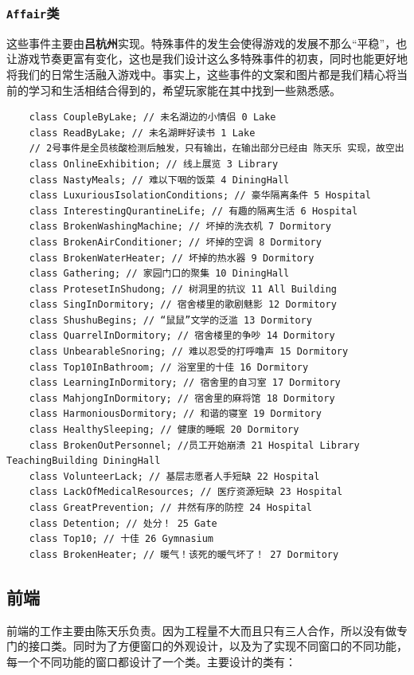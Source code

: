 \documentclass[hyperref,a4paper,UTF8]{ctexart}
\begin{document}
\subsubsection{\texttt{Affair}类}
这些事件主要由\textbf{吕杭州}实现。特殊事件的发生会使得游戏的发展不那么“平稳”，也让游戏节奏更富有变化，这也是我们设计这么多特殊事件的初衷，同时也能更好地将我们的日常生活融入游戏中。事实上，这些事件的文案和图片都是我们精心将当前的学习和生活相结合得到的，希望玩家能在其中找到一些熟悉感。
\begin{verbatim}
    class CoupleByLake; // 未名湖边的小情侣 0 Lake
    class ReadByLake; // 未名湖畔好读书 1 Lake
    // 2号事件是全员核酸检测后触发，只有输出，在输出部分已经由 陈天乐 实现，故空出
    class OnlineExhibition; // 线上展览 3 Library
    class NastyMeals; // 难以下咽的饭菜 4 DiningHall
    class LuxuriousIsolationConditions; // 豪华隔离条件 5 Hospital
    class InterestingQurantineLife; // 有趣的隔离生活 6 Hospital
    class BrokenWashingMachine; // 坏掉的洗衣机 7 Dormitory
    class BrokenAirConditioner; // 坏掉的空调 8 Dormitory
    class BrokenWaterHeater; // 坏掉的热水器 9 Dormitory
    class Gathering; // 家园门口的聚集 10 DiningHall
    class ProtesetInShudong; // 树洞里的抗议 11 All Building
    class SingInDormitory; // 宿舍楼里的歌剧魅影 12 Dormitory
    class ShushuBegins; // “鼠鼠”文学的泛滥 13 Dormitory
    class QuarrelInDormitory; // 宿舍楼里的争吵 14 Dormitory
    class UnbearableSnoring; // 难以忍受的打呼噜声 15 Dormitory
    class Top10InBathroom; // 浴室里的十佳 16 Dormitory
    class LearningInDormitory; // 宿舍里的自习室 17 Dormitory
    class MahjongInDormitory; // 宿舍里的麻将馆 18 Dormitory
    class HarmoniousDormitory; // 和谐的寝室 19 Dormitory
    class HealthySleeping; // 健康的睡眠 20 Dormitory
    class BrokenOutPersonnel; //员工开始崩溃 21 Hospital Library TeachingBuilding DiningHall
    class VolunteerLack; // 基层志愿者人手短缺 22 Hospital
    class LackOfMedicalResources; // 医疗资源短缺 23 Hospital
    class GreatPrevention; // 井然有序的防控 24 Hospital
    class Detention; // 处分！ 25 Gate
    class Top10; // 十佳 26 Gymnasium
    class BrokenHeater; // 暖气！该死的暖气坏了！ 27 Dormitory
\end{verbatim}

\subsection{前端}
前端的工作主要由陈天乐负责。因为工程量不大而且只有三人合作，所以没有做专门的接口类。同时为了方便窗口的外观设计，以及为了实现不同窗口的不同功能，每一个不同功能的窗口都设计了一个类。主要设计的类有：
\end{document}
